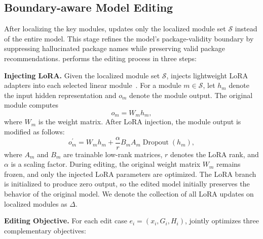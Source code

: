 \subsection{Boundary-aware Model Editing}
After localizing the key modules, \appname updates only the localized module set $\mathcal{S}$ instead of the entire model. This stage refines the model's package-validity boundary by suppressing hallucinated package names while preserving valid package recommendations. \appname performs the editing process in three steps:

\noindent{} \textbf{Injecting LoRA.}
Given the localized module set $\mathcal{S}$, \appname injects lightweight LoRA adapters into each selected linear module~\cite{hu2022lora}. For a module $m \in \mathcal{S}$, let $h_m$ denote the input hidden representation and $o_m$ denote the module output. The original module computes
\begin{equation}
o_m = W_m h_m,
\end{equation}
where $W_m$ is the weight matrix. After LoRA injection, the module output is modified as follows:
\begin{equation}
o_m^{\prime}
=
W_m h_m
+
\frac{\alpha}{r}
B_m A_m \operatorname{Dropout}(h_m),
\end{equation}
where $A_m$ and $B_m$ are trainable low-rank matrices, $r$ denotes the LoRA rank, and $\alpha$ is a scaling factor. During editing, the original weight matrix $W_m$ remains frozen, and only the injected LoRA parameters are optimized. The LoRA branch is initialized to produce zero output, so the edited model initially preserves the behavior of the original model. We denote the collection of all LoRA updates on localized modules as $\Delta$.

\noindent{} \textbf{Editing Objective.}
For each edit case $e_i=(x_i,G_i,H_i)$, \appname jointly optimizes three complementary objectives:


